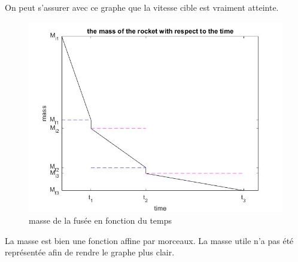On peut s'assurer avec ce graphe que la vitesse cible est vraiment atteinte.

\clearpage
\begin{center}
\begin{figure}[t]
\includegraphics[scale=0.65]{./graphs/mass.jpg}
\caption{masse de la fusée en fonction du temps}
\end{figure}
\end{center}

La masse est bien une fonction affine par morceaux. La masse utile n'a pas été représentée afin de rendre le graphe plus clair.
